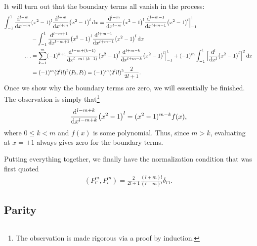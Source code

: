It will turn out that the boundary terms all vanish in the process:
\begin{align}
    \int_{-1}^{1} \dv[l-m]{x} &(x^2-1)^{l} \dv[l+m]{x} (x^2 - 1)^{l} \dd{x} = \dv[l-m]{x} (x^2 - 1)^{l} \dv[l+m-1]{x} (x^2-1)^{l} \Big|_{-1}^{1} \nonumber \\
                                                                           &- \int_{-1}^{1} \dv[l-m+1]{x} (x^2 - 1)^{l} \dv[l+m-1]{x} (x^2 - 1)^{l} \dd{x} \nonumber \\
    \ldots &= \sum_{k=1}^{m} (-1)^{k+1} \dv[l-m+(k-1)]{x} (x^2 - 1)^{l} \dv[l+m-k]{x} (x^2-1)^{l}\Big|_{-1}^{1} + (-1)^{m} \int_{-1}^{1} \Big[ \dv[l]{x} (x^2-1)^{l} \Big]^2 \dd{x} \nonumber \\
           &= (-1)^{m} (2^{l} l!)^2 (P_{l},P_{l}) = (-1)^{m} (2^{l} l!)^{2} \frac{2}{2l+1}
.\end{align}
Once we show why the boundary terms are zero, we will essentially be finished.
The observation is simply that\footnote{The observation is made rigorous via a proof by induction.}
\begin{eqnarray}
    \dv[l-m+k]{x} (x^2 - 1)^{l} = (x^2 - 1)^{m-k} f(x)
,\end{eqnarray}
where $0 \leq k < m$ and $f(x)$ is some polynomial.
Thus, since $m > k$, evaluating at $x = \pm 1$ always gives zero for the boundary terms.

Putting everything together, we finally have the normalization condition that was first quoted
\begin{eqnarray}
    (P_{l'}^{m},P_{l}^{m}) = \frac{2}{2l+1} \frac{(l+m)!}{(l-m)!} \delta_{l'l}
.\end{eqnarray}


\subsection{Parity}


